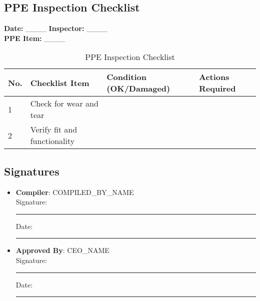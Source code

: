 \documentclass[11pt]{article}
\newcommand{\compilerName}{{{COMPILED_BY_NAME}}}
\begin{document}
\subsection*{PPE Inspection Checklist}

\textbf{Date:} \_\_\_\_ \textbf{Inspector:} \_\_\_\_ \\
\textbf{PPE Item:} \_\_\_\_

\begin{table}[h]
    \centering
    \begin{tabular}{p{1cm}p{5cm}p{2cm}p{3cm}}
        \toprule
        \textbf{No.} & \textbf{Checklist Item} & \textbf{Condition (OK/Damaged)} & \textbf{Actions Required} \\
        \midrule
        1 & Check for wear and tear & & \\
        2 & Verify fit and functionality & & \\
        \bottomrule
    \end{tabular}
    \caption{PPE Inspection Checklist}
\end{table}

\subsection*{Signatures}
\begin{itemize}
  \item \textbf{Compiler}: \compilerName \\
    Signature: \rule{5cm}{0.4pt} \quad Date: \rule{3cm}{0.4pt}
  \item \textbf{Approved By}: {{CEO_NAME}} \\
    Signature: \rule{5cm}{0.4pt} \quad Date: \rule{3cm}{0.4pt}
\end{itemize}
\end{document}
